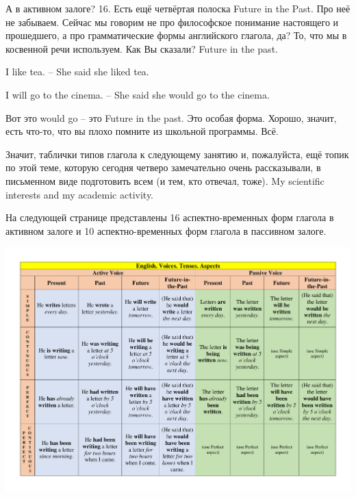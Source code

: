 \documentclass[main.tex]{subfiles}
\begin{document}
А в активном залоге? 16.
Есть ещё четвёртая полоска Future in the Past.
Про неё не забываем.
Сейчас мы говорим не про философское понимание настоящего и прошедшего, а про грамматические формы английского глагола, да?
То, что мы в косвенной речи используем.
Как Вы сказали?
Future in the past.

I like tea. -- She said she liked tea.

I will go to the cinema. -- She said she would go to the cinema.

Вот это would go -- это Future in the past.
Это особая форма.
Хорошо, значит, есть что-то, что вы плохо помните из школьной программы.
Всё.

Значит, таблички типов глагола к следующему занятию и, пожалуйста, ещё топик по этой теме, которую сегодня четверо замечательно очень рассказывали, в письменном виде подготовить всем (и тем, кто отвечал, тоже).
My scientific interests and my academic activity.

\newpage
{}

На следующей странице представлены 16 аспектно-временных форм глагола в активном залоге и 10 аспектно-временных форм глагола в пассивном залоге.\newpage

{\parindent0pt\includegraphics[angle=90,width=\textwidth,page=1,trim={0.5in 0.2in 0.49in 0.2in},clip=true]{EnglishTensesAspectsVoicesPoster.pdf}}
\end{document}
